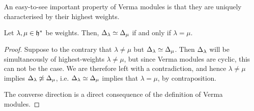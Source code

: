         An easy-to-see important property of Verma modules is that they are uniquely characterised by their highest weights. 
        \begin{proposition} \label{prop: highest_weights_determine_verma_modules}
            Let $\lambda, \mu \in \mathfrak{h}^*$ be weights. Then, $\Delta_{\lambda} \simeq \Delta_{\mu}$ if and only if $\lambda = \mu$.  
        \end{proposition}
            \begin{proof}
                Suppose to the contrary that $\lambda \not = \mu$ but $\Delta_{\lambda} \simeq \Delta_{\mu}$. Then $\Delta_{\lambda}$ will be simultaneously of highest-weights $\lambda \not = \mu$, but since Verma modules are cyclic, this can not be the case. We are therefore left with a contradiction, and hence $\lambda \not = \mu$ implies $\Delta_{\lambda} \not \simeq \Delta_{\mu}$, i.e. $\Delta_{\lambda} \simeq \Delta_{\mu}$ implies that $\lambda = \mu$, by contraposition.

                The converse direction is a direct consequence of the definition of Verma modules. 
            \end{proof}
        
